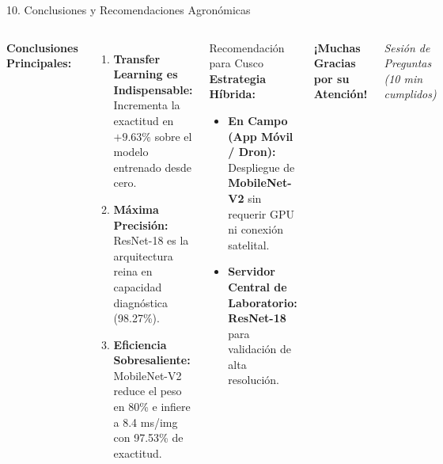 \documentclass[aspectratio=169,10pt]{beamer}
\begin{document}
\begin{frame}{10. Conclusiones y Recomendaciones Agronómicas}
    \begin{columns}
        \textbf{Conclusiones Principales:}
        \begin{enumerate}
            \item \textbf{Transfer Learning es Indispensable:} Incrementa la exactitud en $+9.63\%$ sobre el modelo entrenado desde cero.
            \item \textbf{Máxima Precisión:} ResNet-18 es la arquitectura reina en capacidad diagnóstica (98.27\%).
            \item \textbf{Eficiencia Sobresaliente:} MobileNet-V2 reduce el peso en 80\% e infiere a 8.4 ms/img con 97.53\% de exactitud.
        \end{enumerate}

        \begin{exampleblock}{Recomendación para Cusco}
            \textbf{Estrategia Híbrida:}
            \begin{itemize}
                \item \textbf{En Campo (App Móvil / Dron):} Despliegue de \textbf{MobileNet-V2} sin requerir GPU ni conexión satelital.
                \item \textbf{Servidor Central de Laboratorio:} \textbf{ResNet-18} para validación de alta resolución.
            \end{itemize}
        \end{exampleblock}
        
        \vspace{0.4cm}
        \centering
        {\large \textbf{¡Muchas Gracias por su Atención!}\par}
        \vspace{0.2cm}
        \textit{Sesión de Preguntas (10 min cumplidos)}
    \end{columns}
\end{frame}
\end{document}
